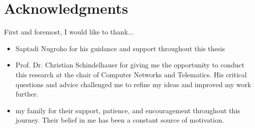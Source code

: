 \chapter{Acknowledgments}

First and foremost, I would like to thank...
\begin{itemize}
\item{Saptadi Nugroho for his guidance and support throughout this thesis}
\item{Prof. Dr. Christian Schindelhauer for giving me the opportunity to conduct this research at the chair of Computer Networks and Telematics. His critical questions and advice challenged me to refine my ideas and improved my work further.}
\item{my family for their support, patience, and encouragement throughout this journey. Their belief in me has been a constant source of motivation.}
\end{itemize}